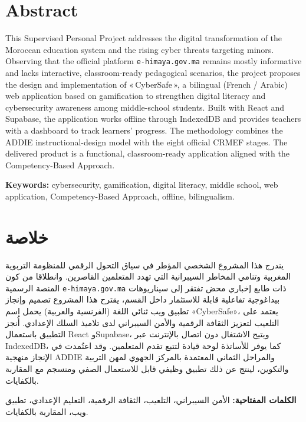 \documentclass[12pt, a4paper, oneside]{report}
\begin{document}
\section*{Abstract}
This Supervised Personal Project addresses the digital transformation of the Moroccan education system and the rising cyber threats targeting minors. Observing that the official platform \texttt{e-himaya.gov.ma} remains mostly informative and lacks interactive, classroom-ready pedagogical scenarios, the project proposes the design and implementation of «\,CyberSafe\,», a bilingual (French / Arabic) web application based on gamification to strengthen digital literacy and cybersecurity awareness among middle-school students. Built with React and Supabase, the application works offline through IndexedDB and provides teachers with a dashboard to track learners' progress. The methodology combines the ADDIE instructional-design model with the eight official CRMEF stages. The delivered product is a functional, classroom-ready application aligned with the Competency-Based Approach.

\textbf{Keywords:} cybersecurity, gamification, digital literacy, middle school, web application, Competency-Based Approach, offline, bilingualism.

\section*{\textarabic{خلاصة}}
\begin{arabic}
يندرج هذا المشروع الشخصي المؤطر في سياق التحول الرقمي للمنظومة التربوية المغربية وتنامي المخاطر السيبرانية التي تهدد المتعلمين القاصرين. وانطلاقا من كون المنصة الرسمية \texttt{e-himaya.gov.ma} ذات طابع إخباري محض تفتقر إلى سيناريوهات بيداغوجية تفاعلية قابلة للاستثمار داخل القسم، يقترح هذا المشروع تصميم وإنجاز تطبيق ويب ثنائي اللغة (الفرنسية والعربية) يحمل اسم «CyberSafe»، يعتمد على التلعيب لتعزيز الثقافة الرقمية والأمن السيبراني لدى تلاميذ السلك الإعدادي. أُنجز التطبيق باستعمال React وSupabase، ويتيح الاشتغال دون اتصال بالإنترنت عبر IndexedDB، كما يوفر للأساتذة لوحة قيادة لتتبع تقدم المتعلمين. وقد اعتُمدت في الإنجاز منهجية ADDIE والمراحل الثماني المعتمدة بالمركز الجهوي لمهن التربية والتكوين، لينتج عن ذلك تطبيق وظيفي قابل للاستعمال الصفي ومنسجم مع المقاربة بالكفايات.

\textbf{الكلمات المفتاحية:} الأمن السيبراني، التلعيب، الثقافة الرقمية، التعليم الإعدادي، تطبيق ويب، المقاربة بالكفايات.
\end{arabic}

\tableofcontents
\listoftables
\listoffigures
\end{document}
